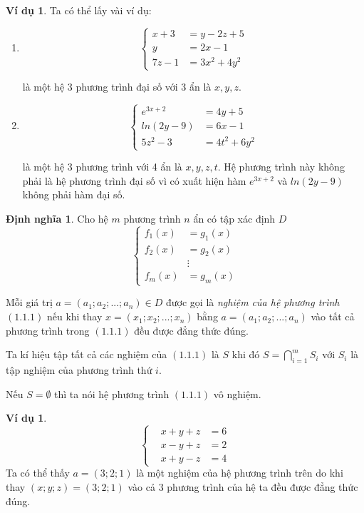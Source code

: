 \documentclass[12pt,a4paper,oneside]{book}
\theoremstyle{theorem}
\theoremstyle{definition}
\newtheorem{dn}[theorem2]{Định nghĩa}
\newtheorem{vd}[theorem2]{Ví dụ}
\begin{document}
    \begin{vd} Ta có thể lấy vài ví dụ:
    \begin{enumerate}
    
      \item \[\left\{
\begin{aligned}
x+3 &= y-2z+5 \\
y &= 2x-1 \\
7z-1 &= 3x^2+4y^2
\end{aligned}
\right.\]

là một hệ 3 phương trình đại số với 3 ẩn là $x,y,z$.
    
    \item \[\left\{
\begin{aligned}
e^{3x+2} &= 4y+5 \\
ln(2y-9)&= 6x-1 \\
5z^2-3 &=4t^2+6y^2
\end{aligned}
\right.\]

    là một hệ 3 phương trình với 4 ẩn là $x,y,z,t$. Hệ phương trình này không phải là hệ phương trình đại số vì có xuất hiện hàm $e^{3x+2}$ và $ln(2y-9)$ không phải hàm đại số. 
 \end{enumerate}
    \end{vd}
    
    \begin{dn}
        Cho hệ $m$ phương trình $n$ ẩn có tập xác định $D$
\begin{equation}
\left\{
\begin{aligned}
f_1(x) &= g_1(x) \\
f_2(x) &= g_2(x) \\
&\vdots \\
f_m(x) &= g_m(x)
\end{aligned}
\right.
\end{equation}

Mỗi giá trị $a=(a_1;a_2;...;a_n) \in D$ được gọi là \textit{nghiệm của hệ phương trình} $(1.1.1)$ nếu khi thay $x=(x_1;x_2;...;x_n)$ bằng $a=(a_1;a_2;...;a_n)$  vào tất cả phương trình trong $(1.1.1)$ đều được đẳng thức đúng.

Ta kí hiệu tập tất cả các nghiệm của $(1.1.1)$ là $S$ khi đó $S=\bigcap_{i=1}^m{S_i}$ với $S_i$ là tập nghiệm của phương trình thứ $i$.

Nếu $S=\emptyset$ thì ta nói hệ phương trình $(1.1.1)$ vô nghiệm.
    \end{dn}
    \begin{vd}
        \[
\left\{
\begin{aligned}
&x+y+z &= 6 \\
&x-y+z&= 2 \\
&x+y-z &= 4
\end{aligned}
\right.
\]
Ta có thể thấy $a=(3;2;1)$ là một nghiệm của hệ phương trình trên do khi thay  $(x;y;z)=(3;2;1)$ vào cả $3$ phương trình của hệ ta đều được đẳng thức đúng.
    \end{vd}
\end{document}
